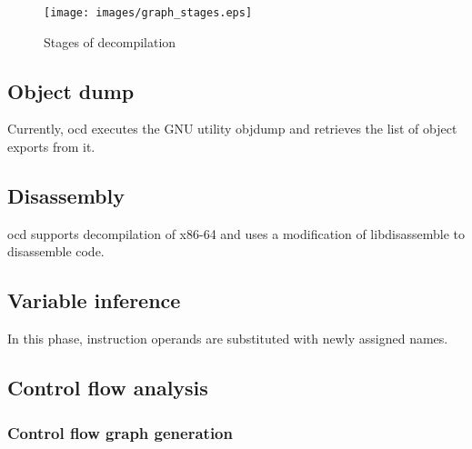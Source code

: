 \documentclass[leqno,11pt]{article}
\begin{document}
\begin{figure}[h!]
\texttt{[image: images/graph\_stages.eps]}
\centering
\caption{Stages of decompilation}
\label{fig:graph_stages}
\end{figure}

\subsection{Object dump}

Currently, ocd executes the GNU utility objdump and retrieves the list of object exports from it.

\subsection{Disassembly}

ocd supports decompilation of x86-64 and uses a modification of libdisassemble to disassemble code.

\subsection{Variable inference}

In this phase, instruction operands are substituted with newly assigned names.

\subsection{Control flow analysis}

\subsubsection{Control flow graph generation}
\end{document}
